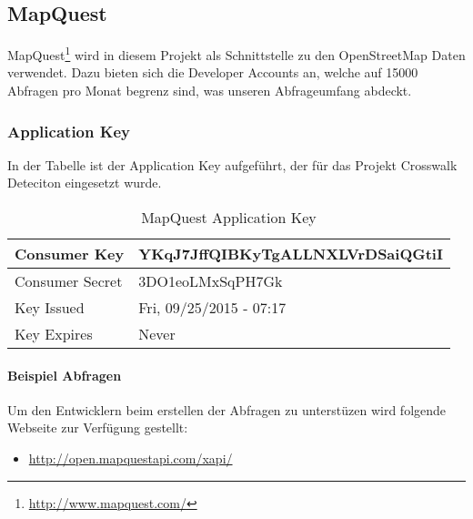 \subsection{MapQuest}
MapQuest\footnote{\url{http://www.mapquest.com/}} wird in diesem Projekt als Schnittstelle zu den OpenStreetMap Daten verwendet. Dazu bieten sich die Developer Accounts an, welche auf 15000 Abfragen pro Monat begrenz sind, was unseren Abfrageumfang abdeckt.

\subsubsection{Application Key}
In der Tabelle ist der Application Key aufgeführt, der für das Projekt Crosswalk Deteciton eingesetzt wurde.
\begin{table}
    \begin{tabular}{ | p{6cm} | p{6cm}  | }
    \hline    
	Consumer Key &  YKqJ7JffQIBKyTgALLNXLVrDSaiQGtiI \\ \hline
	Consumer Secret & 3DO1eoLMxSqPH7Gk \\ \hline
	Key Issued & Fri, 09/25/2015 - 07:17 \\ \hline
	Key Expires & Never \\ \hline
    \end{tabular}
    \caption[MapQuest Application Key]{MapQuest Application Key}
\end{table}

\paragraph{Beispiel Abfragen}
Um den Entwicklern beim erstellen der Abfragen zu unterstüzen wird folgende Webseite zur Verfügung gestellt:
\begin{itemize}
	\item \url{http://open.mapquestapi.com/xapi/}
\end{itemize}










